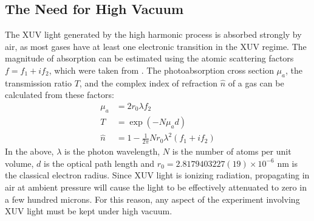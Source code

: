 \subsection{The Need for High Vacuum}


The XUV light generated by the high harmonic process is absorbed strongly by air, as most gases have at least one electronic transition in the XUV regime. The magnitude of absorption can be estimated using the atomic scattering factors $f = f_1 + i f_2$, which were taken from \cite{henkeXRayInteractionsPhotoabsorption1993}. The photoabsorption cross section $\mu_a$, the transmission ratio $T$, and the complex index of refraction $\hat{n}$ of a gas can be calculated from these factors:
\begin{align}
\mu_a &= 2 r_0 \lambda f_2 \label{eqn:PhotoCrossSection} \\
T &= \exp\left( -N \mu_a d \right) \label{eqn:BeersLaw} \\
\hat{n} &= 1 - \frac{1}{2 \pi} N r_0 \lambda^2 \left(f_1 + i f_2\right) \label{eqn:IndexfromASF}
\end{align}
In the above, $\lambda$ is the photon wavelength, $N$ is the number of atoms per unit volume, $d$ is the optical path length and $r_0=2.8179403227(19) \times 10^{-6} \text{ nm}$ is the classical electron radius. Since XUV light is ionizing radiation, propagating in air at ambient pressure will cause the light to be effectively attenuated to zero in a few hundred microns. For this reason, any aspect of the experiment involving XUV light must be kept under high vacuum.


